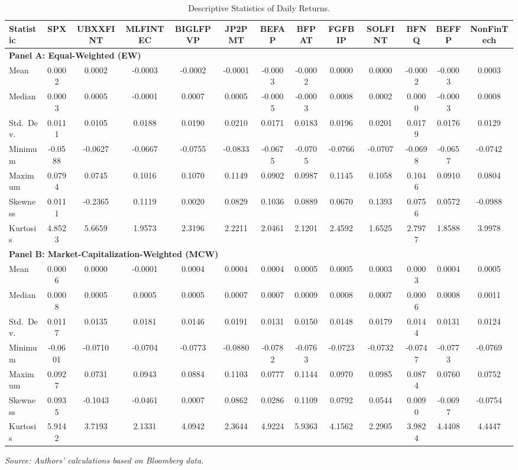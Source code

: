 \documentclass[12pt]{article}
\begin{document}
\begin{table}[htbp]
\centering
\caption{Descriptive Statistics of Daily Returns.}\label{tab:desc_returns}
\begin{adjustbox}{max width=\textwidth}
\begin{tabular}{lcccccccccccc}
\toprule
Statistic & SPX & UBXXFINT & MLFINTEC & BIGLFPVP & JP2PMT & BEFAP & BFPAT & FGFBIP & SOLFINT & BFNQ & BEFFP & NonFinTech \\
\midrule
\multicolumn{13}{l}{\textbf{Panel A: Equal-Weighted (EW)}} \\
\midrule
Mean & 0.0002 & 0.0002 & -0.0003 & -0.0002 & -0.0001 & -0.0003 & -0.0002 & 0.0000 & 0.0000 & -0.0002 & -0.0003 & 0.0003 \\
Median & 0.0003 & 0.0005 & -0.0001 & 0.0007 & 0.0005 & -0.0005 & -0.0003 & 0.0008 & 0.0002 & 0.0000 & -0.0003 & 0.0008 \\
Std.\ Dev. & 0.0111 & 0.0105 & 0.0188 & 0.0190 & 0.0210 & 0.0171 & 0.0183 & 0.0196 & 0.0201 & 0.0179 & 0.0176 & 0.0129 \\
Minimum & -0.0588 & -0.0627 & -0.0667 & -0.0755 & -0.0833 & -0.0675 & -0.0705 & -0.0766 & -0.0707 & -0.0698 & -0.0657 & -0.0742 \\
Maximum & 0.0794 & 0.0745 & 0.1016 & 0.1070 & 0.1149 & 0.0902 & 0.0987 & 0.1145 & 0.1058 & 0.1046 & 0.0910 & 0.0804 \\
Skewness & 0.0111 & -0.2365 & 0.1119 & 0.0020 & 0.0829 & 0.1036 & 0.0889 & 0.0670 & 0.1393 & 0.0756 & 0.0572 & -0.0988 \\
Kurtosis & 4.8523 & 5.6659 & 1.9573 & 2.3196 & 2.2211 & 2.0461 & 2.1201 & 2.4592 & 1.6525 & 2.7977 & 1.8588 & 3.9978 \\
\midrule
\multicolumn{13}{l}{\textbf{Panel B: Market-Capitalization-Weighted (MCW)}} \\
\midrule
Mean & 0.0006 & 0.0000 & -0.0001 & 0.0004 & 0.0004 & 0.0004 & 0.0005 & 0.0005 & 0.0003 & 0.0003 & 0.0004 & 0.0005 \\
Median & 0.0008 & 0.0005 & 0.0005 & 0.0005 & 0.0007 & 0.0007 & 0.0009 & 0.0008 & 0.0007 & 0.0006 & 0.0008 & 0.0011 \\
Std.\ Dev. & 0.0117 & 0.0135 & 0.0181 & 0.0146 & 0.0191 & 0.0131 & 0.0150 & 0.0148 & 0.0179 & 0.0144 & 0.0131 & 0.0124 \\
Minimum & -0.0601 & -0.0710 & -0.0704 & -0.0773 & -0.0880 & -0.0782 & -0.0763 & -0.0723 & -0.0732 & -0.0747 & -0.0773 & -0.0769 \\
Maximum & 0.0927 & 0.0731 & 0.0943 & 0.0884 & 0.1103 & 0.0777 & 0.1144 & 0.0970 & 0.0985 & 0.0874 & 0.0760 & 0.0752 \\
Skewness & 0.0935 & -0.1043 & -0.0461 & 0.0007 & 0.0862 & 0.0286 & 0.1109 & 0.0792 & 0.0544 & 0.0090 & -0.0697 & -0.0754 \\
Kurtosis & 5.9142 & 3.7193 & 2.1331 & 4.0942 & 2.3644 & 4.9224 & 5.9363 & 4.1562 & 2.2905 & 3.9824 & 4.4408 & 4.4447 \\
\bottomrule
\end{tabular}
\end{adjustbox}
\vspace{2pt}
{\footnotesize \textit{Source: Authors' calculations based on Bloomberg data.}}
\end{table}
\end{document}
